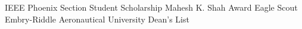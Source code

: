 \documentclass[../Resume]{subfiles}
\begin{document}
    \Entry IEEE Phoenix Section Student Scholarship Mahesh K. Shah Award
    \Entry Eagle Scout
    \Entry Embry-Riddle Aeronautical University Dean's List
\end{document}
